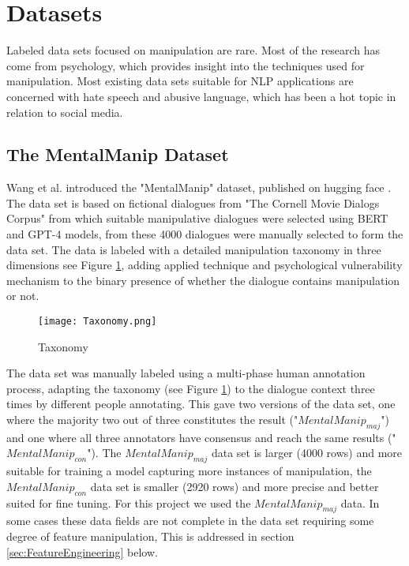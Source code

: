 \documentclass[
	letterpaper, %
	12pt, %
	unnumberedsections, %
	twoside, %
]{LTJournalArticle}
\begin{document}
\section{Datasets}
Labeled data sets focused on manipulation are rare. Most of the research has come from psychology, which provides insight into the techniques used for manipulation. Most existing data sets suitable for NLP applications are concerned with hate speech and abusive language, which has been a hot topic in relation to social media.

\subsection{The MentalManip Dataset}
Wang et al. \cite{MentalManip} introduced the "MentalManip" dataset, published on hugging face \cite{MentalManipDataset}. The data set is based on fictional dialogues from "The Cornell Movie Dialogs Corpus" \cite{CornellMovieCorpus} from which suitable manipulative dialogues were selected using BERT and GPT-4 models, from these 4000 dialogues were manually selected to form the data set. The data is labeled with a detailed manipulation taxonomy in three dimensions see Figure \ref{fig:Taxonomy}, adding applied technique and psychological vulnerability mechanism to the binary presence of whether the dialogue contains manipulation or not.
\begin{figure}[!htp] %
	\centering
     	\texttt{[image: Taxonomy.png]}
	\caption{Taxonomy}
	\label{fig:Taxonomy}
\end{figure}

The data set was manually labeled using a multi-phase human annotation process, adapting the taxonomy (see Figure \ref{fig:Taxonomy}) to the dialogue context three times by different people annotating. This gave two versions of the data set, one where the majority two out of three constitutes the result ("$MentalManip_{maj}$") and one where all three annotators have consensus and reach the same results ("$MentalManip_{con}$"). The $MentalManip_{maj}$ data set is larger (4000 rows) and more suitable for training a model capturing more instances of manipulation, the $MentalManip_{con}$ data set is smaller (2920 rows) and more precise and better suited for fine tuning. For this project we used the $MentalManip_{maj}$ data. In some cases these data fields are not complete in the data set requiring some degree of feature manipulation, This is addressed in section \ref{sec:FeatureEngineering} below.
\end{document}
